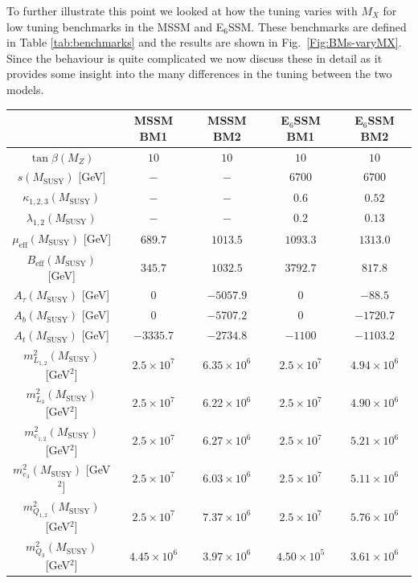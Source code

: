 \documentclass[preprint,amsmath,amssymb,aps,superscriptaddress,prd,showpacs,floatfix,nofootinbib]{revtex4-1}
\begin{document}
To further illustrate this point we looked at how the tuning varies
with $M_X$ for low tuning benchmarks in the MSSM and E$_6$SSM. These
benchmarks are defined in Table \ref{tab:benchmarks} and the results
are shown in Fig.~\ref{Fig:BMs-varyMX}. Since the behaviour is quite
complicated we now discuss these in detail as it provides some insight
into the many differences in the tuning between the two models.

\begingroup
\squeezetable
\begin{table}[h]
\centering
\begin{ruledtabular}
\begin{tabular}{ccccc}
& MSSM BM1 & MSSM BM2 & E$_6$SSM BM1 & E$_6$SSM BM2 \\
\hline
$\tan\beta(M_Z)$ & $10$ & $10$ & $10$ & $10$ \\
$s(M_{\mathrm{SUSY}})$ [GeV] & $-$ & $-$ & $6700$ & $6700$ \\
$\kappa_{1,2,3}(M_{\mathrm{SUSY}})$ & $-$ & $-$ & $0.6$ & $0.52$ \\
$\lambda_{1,2}(M_{\mathrm{SUSY}})$ & $-$ & $-$ & $0.2$ & $0.13$ \\
$\mu_{\mathrm{eff}}(M_{\mathrm{SUSY}})$ [GeV] & $689.7$ & $1013.5$ & $1093.3$ & $1313.0$ \\
$B_{\mathrm{eff}}(M_{\mathrm{SUSY}})$ [GeV] & $345.7$ & $1032.5$ & $3792.7$ & $817.8$ \\
$A_\tau(M_{\mathrm{SUSY}})$ [GeV] & $0$ & $-5057.9$ & $0$ & $-88.5$ \\
$A_b(M_{\mathrm{SUSY}})$ [GeV] & $0$ & $-5707.2$ & $0$ & $-1720.7$\\
$A_t(M_{\mathrm{SUSY}})$ [GeV] & $-3335.7$ & $-2734.8$ & $-1100$ & $-1103.2$ \\
$m_{L_{1,2}}^2(M_{\mathrm{SUSY}})$ [GeV$^2$] & $2.5\times 10^7$ & $6.35\times 10^6$ & $2.5\times 10^7$ & $4.94\times 10^6$ \\
$m_{L_3}^2(M_{\mathrm{SUSY}})$ [GeV$^2$] & $2.5\times 10^7$ & $6.22\times 10^6$ & $2.5\times 10^7$ & $4.90\times 10^6$ \\
$m_{e_{1,2}}^2(M_{\mathrm{SUSY}})$ [GeV$^2$] & $2.5\times 10^7$ & $6.27\times 10^6$ & $2.5\times 10^7$ & $5.21\times 10^6$ \\
$m_{e_3}^2(M_{\mathrm{SUSY}})$ [GeV$^2$] & $2.5\times 10^7$ & $6.03\times 10^6$ & $2.5\times 10^7$ & $5.11\times 10^6$ \\
$m_{Q_{1,2}}^2(M_{\mathrm{SUSY}})$ [GeV$^2$] & $2.5\times 10^7$ & $7.37\times 10^6$ & $2.5\times 10^7$ & $5.76\times 10^6$ \\
$m_{Q_3}^2(M_{\mathrm{SUSY}})$ [GeV$^2$] & $4.45\times 10^6$ & $3.97\times 10^6$ & $4.50\times 10^5$ & $3.61\times 10^6$ \\

\end{tabular}
\end{ruledtabular}
\end{table}
\end{document}
